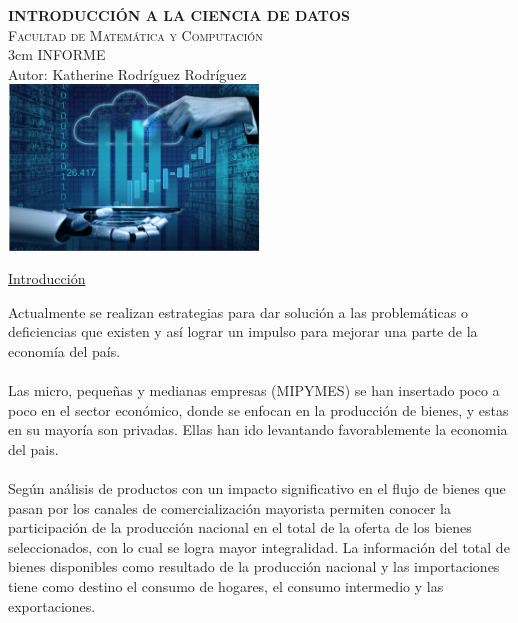 \documentclass{article}
\begin{document}
    \begin{titlepage}
        \centering
        {\bfseries\Huge INTRODUCCIÓN A LA CIENCIA DE DATOS }\\
        \vspace{2cm}
        {\scshape\large Facultad de Matemática y Computación}\\
        \vspace
        {3cm}
        {\scshape\large INFORME }\\
        \vspace{3cm}
        {\Large Autor:}
        {\large Katherine Rodríguez Rodríguez}\\
        \vspace{3cm}
        \includegraphics[width= 0.5\textwidth]{CD}
    \end{titlepage}
    \begin{center}
        {\underline{\large{Introducción}}}\\
    \end{center}
    \vspace{1cm}
    Actualmente se realizan estrategias para dar solución a las problemáticas o deficiencias que existen y así lograr un impulso para mejorar una parte de la economía del país.\\
    \\
    Las micro, pequeñas y medianas empresas (MIPYMES) se han insertado poco a poco en el sector económico, donde se enfocan en la producción de bienes, y estas en su mayoría son privadas. Ellas han ido levantando favorablemente la economia del pais.\\
    \\
    Según análisis de productos con un impacto significativo en el flujo de bienes que pasan por los canales de comercialización mayorista permiten conocer la participación de la producción nacional en el total de la oferta de los bienes seleccionados, con lo cual se logra mayor integralidad.
    La información del total de bienes disponibles como resultado de la producción nacional y las importaciones tiene como destino el consumo de hogares, el consumo intermedio y las exportaciones.\\
\end{document}
